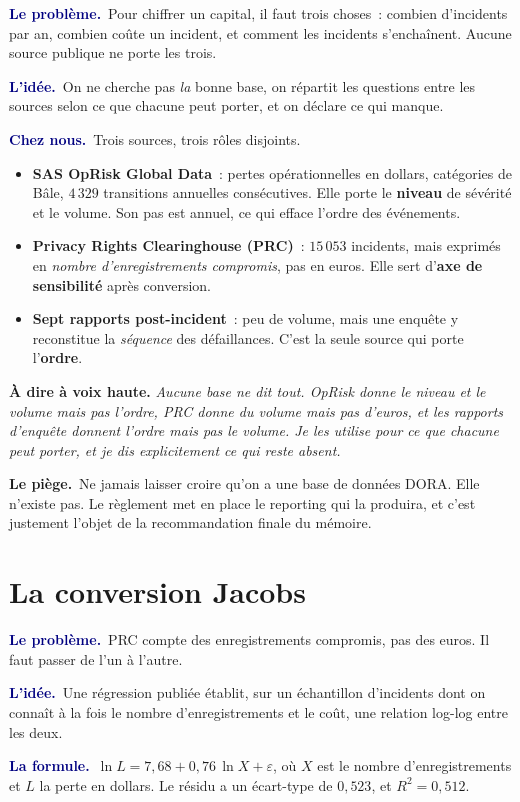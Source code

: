 \documentclass[11pt,a4paper]{article}
\newcommand{\lequoi}[1]{\smallskip\noindent\textcolor{navy}{\textbf{Le problème.}}\ #1\par}
\newcommand{\lidee}[1]{\smallskip\noindent\textcolor{navy}{\textbf{L'idée.}}\ #1\par}
\newcommand{\laformule}[1]{\smallskip\noindent\textcolor{navy}{\textbf{La formule.}}\ #1\par}
\newcommand{\cheznous}[1]{\smallskip\noindent\textcolor{navy}{\textbf{Chez nous.}}\ #1\par}
\newcommand{\lepiege}[1]{\smallskip\noindent\textcolor{accent}{\textbf{Le piège.}}\ #1\par}
\newcommand{\laphrase}[1]{\begin{phrasebox}\textbf{À dire à voix haute.} \emph{#1}\end{phrasebox}}
\begin{document}
\lequoi{Pour chiffrer un capital, il faut trois choses~: combien d'incidents par an, combien
coûte un incident, et comment les incidents s'enchaînent. Aucune source publique ne porte
les trois.}

\lidee{On ne cherche pas \emph{la} bonne base, on répartit les questions entre les sources
selon ce que chacune peut porter, et on déclare ce qui manque.}

\cheznous{Trois sources, trois rôles disjoints.
\begin{itemize}[itemsep=1pt,topsep=2pt]
\item \textbf{SAS OpRisk Global Data}~: pertes opérationnelles en dollars, catégories de
Bâle, $4\,329$ transitions annuelles consécutives. Elle porte le \textbf{niveau} de
sévérité et le volume. Son pas est annuel, ce qui efface l'ordre des événements.
\item \textbf{Privacy Rights Clearinghouse (PRC)}~: $15\,053$ incidents, mais exprimés en
\emph{nombre d'enregistrements compromis}, pas en euros. Elle sert d'\textbf{axe de
sensibilité} après conversion.
\item \textbf{Sept rapports post-incident}~: peu de volume, mais une enquête y reconstitue
la \emph{séquence} des défaillances. C'est la seule source qui porte l'\textbf{ordre}.
\end{itemize}}

\laphrase{Aucune base ne dit tout. OpRisk donne le niveau et le volume mais pas l'ordre,
PRC donne du volume mais pas d'euros, et les rapports d'enquête donnent l'ordre mais pas le
volume. Je les utilise pour ce que chacune peut porter, et je dis explicitement ce qui
reste absent.}

\lepiege{Ne jamais laisser croire qu'on a \og une base de données DORA\fg{}. Elle n'existe pas.
Le règlement met en place le reporting qui la produira, et c'est justement l'objet de la
recommandation finale du mémoire.}

\section{La conversion Jacobs}

\lequoi{PRC compte des enregistrements compromis, pas des euros. Il faut passer de l'un à
l'autre.}

\lidee{Une régression publiée établit, sur un échantillon d'incidents dont on connaît à la
fois le nombre d'enregistrements et le coût, une relation log-log entre les deux.}

\laformule{$\ln L = 7{,}68 + 0{,}76\,\ln X + \varepsilon$, où $X$ est le nombre
d'enregistrements et $L$ la perte en dollars. Le résidu a un écart-type de $0{,}523$, et
$R^2 = 0{,}512$.}
\end{document}
